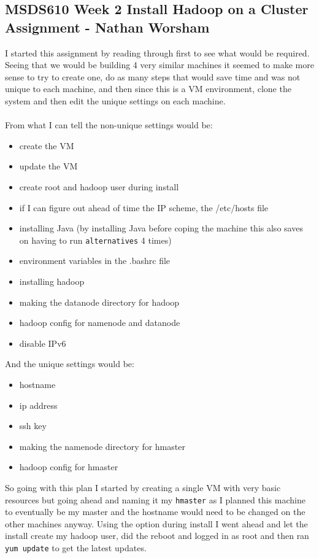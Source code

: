 \documentclass[10pt]{article}
\begin{document}
\subsection*{MSDS610 Week 2 Install Hadoop on a Cluster Assignment - Nathan Worsham}
I started this assignment by reading through first to see what would be required. Seeing that we would be building 4 very similar machines it seemed to make more sense to try to create one, do as many steps that would save time and was not unique to each machine, and then since this is a VM environment, clone the system and then edit the unique settings on each machine.\\
\\From what I can tell the non-unique settings would be:
\begin{itemize}
\itemsep-0.5em 
\item create the VM
\item update the VM
\item create root and hadoop user during install
\item if I can figure out ahead of time the IP scheme, the /etc/hosts file
\item installing Java (by installing Java before coping the machine this also saves on having to run \verb|alternatives| 4 times)
\item environment variables in the .bashrc file
\item installing hadoop
\item making the datanode directory for hadoop
\item hadoop config for namenode and datanode
\item disable IPv6
\end{itemize}
And the unique settings would be:
\begin{itemize}
\itemsep-0.5em 
\item hostname
\item ip address
\item ssh key
\item making the namenode directory for hmaster
\item hadoop config for hmaster
\end{itemize}
So going with this plan I started by creating a single VM with very basic resources but going ahead and naming it my \verb|hmaster| as I planned this machine to eventually be my master and the hostname would need to be changed on the other machines anyway. Using the option during install I went ahead and let the install create my hadoop user, did the reboot and logged in as root and then ran \verb|yum update| to get the latest updates.\\
\end{document}
